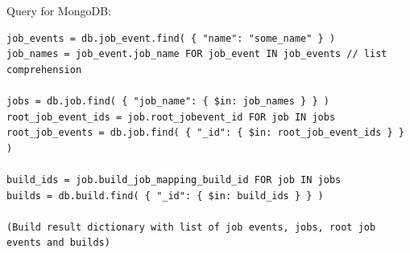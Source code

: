 Query for MongoDB:
\begin{verbatim}
job_events = db.job_event.find( { "name": "some_name" } )
job_names = job_event.job_name FOR job_event IN job_events // list comprehension

jobs = db.job.find( { "job_name": { $in: job_names } } )
root_job_event_ids = job.root_jobevent_id FOR job IN jobs
root_job_events = db.job.find( { "_id": { $in: root_job_event_ids } } )

build_ids = job.build_job_mapping_build_id FOR job IN jobs
builds = db.build.find( { "_id": { $in: build_ids } } )

(Build result dictionary with list of job events, jobs, root job events and builds)
 
\end{verbatim}






